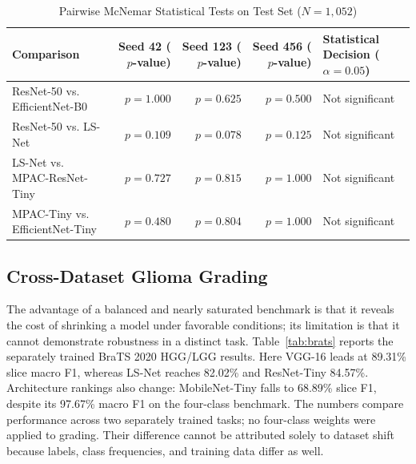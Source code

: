 \begin{table}[t]
\caption{Pairwise McNemar Statistical Tests on Test Set ($N=1{,}052$)}\label{tab:stats}
\centering\scriptsize
\begin{tabular}{lrrrl}
\toprule
Comparison & Seed 42 ($p$-value) & Seed 123 ($p$-value) & Seed 456 ($p$-value) & Statistical Decision ($\alpha=0.05$) \\
\midrule
ResNet-50 vs. EfficientNet-B0 & $p=1.000$ & $p=0.625$ & $p=0.500$ & Not significant \\
ResNet-50 vs. LS-Net & $p=0.109$ & $p=0.078$ & $p=0.125$ & Not significant \\
LS-Net vs. MPAC-ResNet-Tiny & $p=0.727$ & $p=0.815$ & $p=1.000$ & Not significant \\
MPAC-Tiny vs. EfficientNet-Tiny & $p=0.480$ & $p=0.804$ & $p=1.000$ & Not significant \\
\bottomrule
\end{tabular}
\end{table}

\subsection{Cross-Dataset Glioma Grading}
The advantage of a balanced and nearly saturated benchmark is that it reveals the cost of shrinking a model under favorable conditions; its limitation is that it cannot demonstrate robustness in a distinct task. Table~\ref{tab:brats} reports the separately trained BraTS 2020 HGG/LGG results. Here VGG-16 leads at 89.31\% slice macro F1, whereas LS-Net reaches 82.02\% and ResNet-Tiny 84.57\%. Architecture rankings also change: MobileNet-Tiny falls to 68.89\% slice F1, despite its 97.67\% macro F1 on the four-class benchmark. The numbers compare performance across two separately trained tasks; no four-class weights were applied to grading. Their difference cannot be attributed solely to dataset shift because labels, class frequencies, and training data differ as well.

